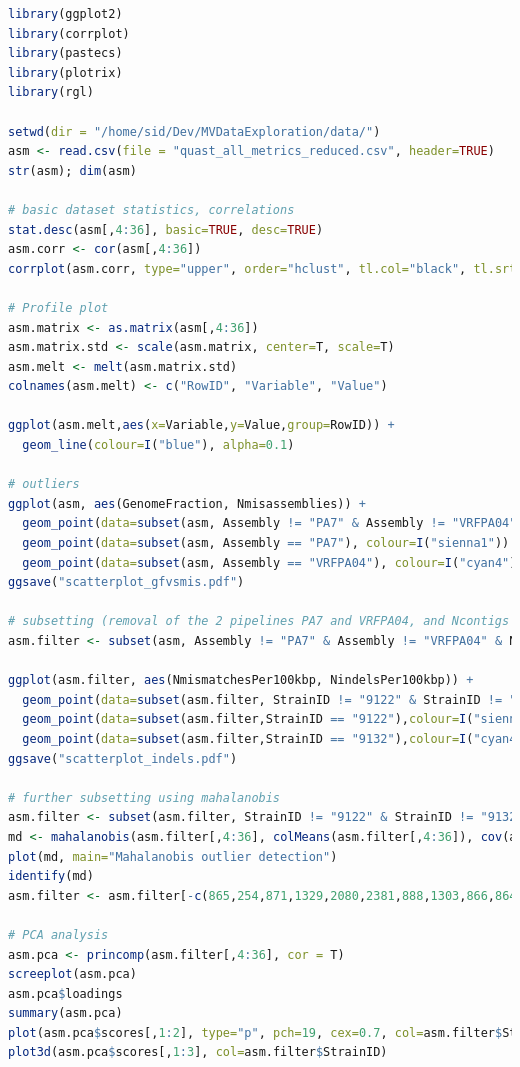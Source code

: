 \documentclass[11pt, a4paper,titlepage]{article}
\begin{document}
\begin{lstlisting}[language=R]
library(ggplot2)
library(corrplot)
library(pastecs)
library(plotrix)
library(rgl)

setwd(dir = "/home/sid/Dev/MVDataExploration/data/")
asm <- read.csv(file = "quast_all_metrics_reduced.csv", header=TRUE)
str(asm); dim(asm)

# basic dataset statistics, correlations
stat.desc(asm[,4:36], basic=TRUE, desc=TRUE)
asm.corr <- cor(asm[,4:36])
corrplot(asm.corr, type="upper", order="hclust", tl.col="black", tl.srt=90)

# Profile plot 
asm.matrix <- as.matrix(asm[,4:36]) 
asm.matrix.std <- scale(asm.matrix, center=T, scale=T) 
asm.melt <- melt(asm.matrix.std)
colnames(asm.melt) <- c("RowID", "Variable", "Value")

ggplot(asm.melt,aes(x=Variable,y=Value,group=RowID)) +
  geom_line(colour=I("blue"), alpha=0.1)

# outliers
ggplot(asm, aes(GenomeFraction, Nmisassemblies)) +
  geom_point(data=subset(asm, Assembly != "PA7" & Assembly != "VRFPA04"), colour=I("blue"),alpha=0.5) +
  geom_point(data=subset(asm, Assembly == "PA7"), colour=I("sienna1")) +
  geom_point(data=subset(asm, Assembly == "VRFPA04"), colour=I("cyan4"))
ggsave("scatterplot_gfvsmis.pdf")

# subsetting (removal of the 2 pipelines PA7 and VRFPA04, and Ncontigs > 400)
asm.filter <- subset(asm, Assembly != "PA7" & Assembly != "VRFPA04" & Ncontigs < 400)

ggplot(asm.filter, aes(NmismatchesPer100kbp, NindelsPer100kbp)) +
  geom_point(data=subset(asm.filter, StrainID != "9122" & StrainID != "9132"), colour=I("blue"),alpha=0.5) +
  geom_point(data=subset(asm.filter,StrainID == "9122"),colour=I("sienna1")) +
  geom_point(data=subset(asm.filter,StrainID == "9132"),colour=I("cyan4"))
ggsave("scatterplot_indels.pdf")

# further subsetting using mahalanobis
asm.filter <- subset(asm.filter, StrainID != "9122" & StrainID != "9132" & Ncontigs < 400)
md <- mahalanobis(asm.filter[,4:36], colMeans(asm.filter[,4:36]), cov(asm.filter[,4:36]))
plot(md, main="Mahalanobis outlier detection")
identify(md)
asm.filter <- asm.filter[-c(865,254,871,1329,2080,2381,888,1303,866,864),]

# PCA analysis
asm.pca <- princomp(asm.filter[,4:36], cor = T)
screeplot(asm.pca)
asm.pca$loadings
summary(asm.pca)
plot(asm.pca$scores[,1:2], type="p", pch=19, cex=0.7, col=asm.filter$StrainID)
plot3d(asm.pca$scores[,1:3], col=asm.filter$StrainID)


\end{lstlisting}
\end{document}

